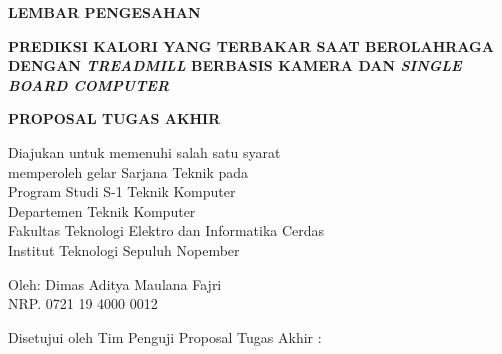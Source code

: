 \begin{center}
	\large
  \textbf{LEMBAR PENGESAHAN}
\end{center}



\begin{center}
  \textbf{PREDIKSI KALORI YANG TERBAKAR SAAT BEROLAHRAGA DENGAN \emph{TREADMILL} BERBASIS KAMERA DAN \emph{SINGLE BOARD COMPUTER}}
\end{center}

\begingroup
  \begin{center}
    \textbf{PROPOSAL TUGAS AKHIR}
  \end{center}
    
  \small

  \begin{center}
    Diajukan untuk memenuhi salah satu syarat\\
    memperoleh gelar Sarjana Teknik pada\\
    Program Studi S-1 Teknik Komputer\\
    Departemen Teknik Komputer\\
    Fakultas Teknologi Elektro dan Informatika Cerdas\\
    Institut Teknologi Sepuluh Nopember
  \end{center}

  \begin{center}
    Oleh: Dimas Aditya Maulana Fajri\\
    NRP. 0721 19 4000 0012
  \end{center}


  \begin{center}
    Disetujui oleh Tim Penguji Proposal Tugas Akhir :
  \end{center}

  \begingroup
    \setlength{\tabcolsep}{0pt}

